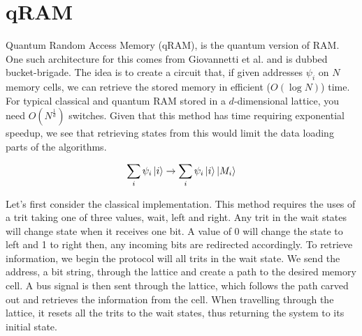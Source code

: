 \documentclass{article}
\theoremstyle{definition}
\begin{document}
\section{qRAM}
Quantum Random Access Memory (qRAM), is the quantum version of RAM. One such architecture for this comes from Giovannetti et al. \cite{Giovannetti_2008} and is dubbed bucket-brigade. The idea is to create a circuit that, if given addresses $\psi_i$ on $N$ memory cells, we can retrieve the stored memory in efficient ($O(\log N)$) time. For typical classical and quantum RAM stored in a $d$-dimensional lattice, you need $O(N^{\frac{1}{d}})$ switches. Given that this method has time requiring exponential speedup, we see that retrieving states from this would limit the data loading parts of the algorithms.

\[
\sum_i \psi_i \ket{i} \to \sum_i \psi_i \ket{i} \ket{M_i}
\]

Let's first consider the classical implementation. This method requires the uses of a trit taking one of three values, wait, left and right. Any trit in the wait states will change state when it receives one bit. A value of 0 will change the state to left and 1 to right then, any incoming bits are redirected accordingly. To retrieve information, we begin the protocol will all trits in the wait state. We send the address, a bit string, through the lattice and create a path to the desired memory cell. A bus signal is then sent through the lattice, which follows the path carved out and retrieves the information from the cell. When travelling through the lattice, it resets all the trits to the wait states, thus returning the system to its initial state. 

\end{document}
